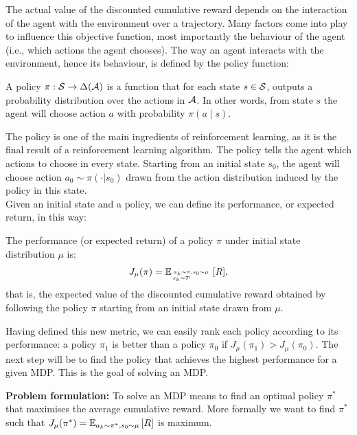The actual value of the discounted cumulative reward depends on the interaction of the agent with the environment over a trajectory. Many factors come into play to influence this objective function, most importantly the behaviour of the agent (i.e., which actions the agent chooses). The way an agent interacts with the environment, hence its behaviour, is defined by the policy function:
\begin{definition}
A policy $\pi: \sspace \rightarrow \Delta (\aspace)$ is a function that for each state $s \in \sspace$, outputs a probability distribution over the actions in $\aspace$. In other words, from state $s$ the agent will choose action $a$ with probability $\pi(a \mid s)$.
\end{definition}

The policy is one of the main ingredients of reinforcement learning, as it is the final result of a reinforcement learning algorithm. The policy tells the agent which actions to choose in every state.
Starting from an initial state $s_0$, the agent will choose action $a_0 \sim \pi(\cdot | s_0)$ drawn from the action distribution induced by the policy in this state. \\
Given an initial state and a policy, we can define its performance, or expected return, in this way:
\begin{definition}
The performance (or expected return) of a policy $\pi$ under initial state distribution $\mu$ is:
\[
J_\mu(\pi) = \EV[{\genfrac{}{}{0pt}{}{a_k \sim \pi, s_0 \sim \mu}{s_k \sim \tfunc \hspace{20pt}}}]{R},
\]
that is, the expected value of the discounted cumulative reward obtained by following the policy $\pi$ starting from an initial state drawn from $\mu$.
\end{definition}
Having defined this new metric, we can easily rank each policy according to its performance: a policy $\pi_1$ is better than a policy $\pi_0$ if $J_\mu(\pi_1) > J_\mu(\pi_0)$. The next step will be to find the policy that achieves the highest performance for a given MDP. This is the goal of solving an MDP.

\textbf{Problem formulation:}\quad
To solve an MDP means to find an optimal policy $\pi^*$ that maximises the average cumulative reward. More formally we want to find $\pi^*$ such that $J_\mu(\pi^*)=\EV[a_k \sim \pi^*, s_0 \sim \mu]{R}$ is maximum.


